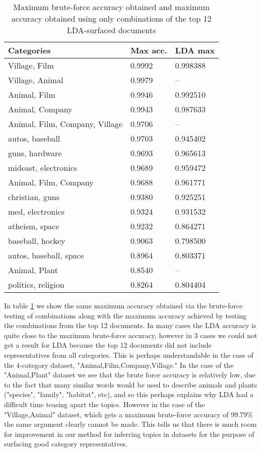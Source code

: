 \begin{table}[]
\centering
\captionsetup{position=bottom}
\begin{tabular}{lll}
\toprule
Categories                  & Max acc. & LDA max \\
\midrule
Village, Film                & 0.9992       & 0.998388    \\
Village, Animal              & 0.9979       & --         \\
Animal, Film                 & 0.9946       & 0.992510    \\
Animal, Company              & 0.9943       & 0.987633    \\
Animal, Film, Company, Village & 0.9706       & --         \\
autos, baseball              & 0.9703       & 0.945402    \\
guns, hardware               & 0.9693       & 0.965613    \\
mideast, electronics         & 0.9689       & 0.959472    \\
Animal, Film, Company         & 0.9688       & 0.961771    \\
christian, guns              & 0.9380       & 0.925251    \\
med, electronics             & 0.9324       & 0.931532    \\
atheism, space               & 0.9232       & 0.864271    \\
baseball, hockey             & 0.9063       & 0.798500    \\
autos, baseball, space        & 0.8964       & 0.803371    \\
Animal, Plant                & 0.8540       & --         \\
politics, religion           & 0.8264       & 0.804404   \\
\bottomrule
\end{tabular}
\caption{Maximum brute-force accuracy obtained and maximum accuracy obtained using only combinations of the top 12 LDA-surfaced documents}\label{ldaacc}
\end{table}

In table \ref{ldaacc} we show the same maximum accuracy obtained via the brute-force testing of combinations along with the maximum accuracy achieved by testing the combinations from the top 12 documents. In many cases the LDA accuracy is quite close to the maximum brute-force accuracy, however in 3 cases we could not get a result for LDA because the top 12 documents did not include representatives from all categories. This is perhaps understandable in the case of the 4-category dataset, "Animal,Film,Company,Village." In the case of the "Animal,Plant" dataset we see that the brute force accuracy is relatively low, due to the fact that many similar words would be used to describe animals and plants ("species", "family", "habitat", etc), and so this perhaps explains why LDA had a difficult time teasing apart the topics. However in the case of the "Village,Animal" dataset, which gets a maximum brute-force accuracy of 99.79\% the same argument clearly cannot be made. This tells us that there is much room for improvement in our method for inferring topics in datasets for the purpose of surfacing good category representatives.

